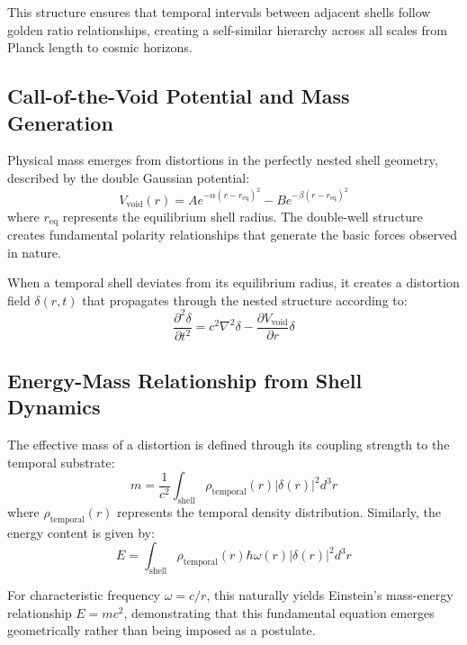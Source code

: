 \documentclass[12pt,a4paper]{article}
\begin{document}
This structure ensures that temporal intervals between adjacent shells follow golden ratio relationships, creating a self-similar hierarchy across all scales from Planck length to cosmic horizons.

\subsection{Call-of-the-Void Potential and Mass Generation}

Physical mass emerges from distortions in the perfectly nested shell geometry, described by the double Gaussian potential:
\begin{equation}
V_{\text{void}}(r) = A e^{-\alpha(r-r_{\text{eq}})^2} - B e^{-\beta(r-r_{\text{eq}})^2}
\end{equation}
where $r_{\text{eq}}$ represents the equilibrium shell radius. The double-well structure creates fundamental polarity relationships that generate the basic forces observed in nature.

When a temporal shell deviates from its equilibrium radius, it creates a distortion field $\delta(r,t)$ that propagates through the nested structure according to:
\begin{equation}
\frac{\partial^2 \delta}{\partial t^2} = c^2 \nabla^2 \delta - \frac{\partial V_{\text{void}}}{\partial r} \delta
\end{equation}

\subsection{Energy-Mass Relationship from Shell Dynamics}

The effective mass of a distortion is defined through its coupling strength to the temporal substrate:
\begin{equation}
m = \frac{1}{c^2} \int_{\text{shell}} \rho_{\text{temporal}}(r) |\delta(r)|^2 d^3r
\end{equation}
where $\rho_{\text{temporal}}(r)$ represents the temporal density distribution. Similarly, the energy content is given by:
\begin{equation}
E = \int_{\text{shell}} \rho_{\text{temporal}}(r) \hbar \omega(r) |\delta(r)|^2 d^3r
\end{equation}

For characteristic frequency $\omega = c/r$, this naturally yields Einstein's mass-energy relationship $E = mc^2$, demonstrating that this fundamental equation emerges geometrically rather than being imposed as a postulate.
\end{document}
